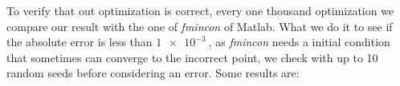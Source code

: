 \documentclass[12pt]{article}
\theoremstyle{definition}
\theoremstyle{remark}
\begin{document}
To verify that out optimization is correct, every one thousand optimization we compare our result with the one of \textit{fmincon} of Matlab. What we do it to see if the absolute error is less than $\SI{1e-3}{}$, as \textit{fmincon} needs a initial condition that sometimes can converge to the incorrect point, we check with up to 10 random seeds before considering an error. Some results are:
\end{document}
